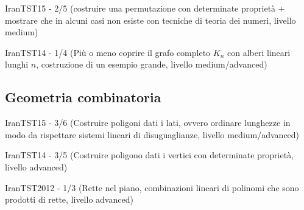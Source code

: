 \documentclass[a4paper,10pt]{article}
\newcommand{\Pro}[3]{#1#2 - #3}
\begin{document}
\Pro{IranTST}{15}{2/5} (costruire una permutazione con determinate proprietà + mostrare che in alcuni casi non esiste con tecniche
di teoria dei numeri, livello medium)

\Pro{IranTST}{14}{1/4} (Più o meno coprire il grafo completo $K_n$ con alberi lineari lunghi $n$, costruzione di un esempio grande,
livello medium/advanced)

\subsection{Geometria combinatoria}
\Pro{IranTST}{15}{3/6} (Costruire poligoni dati i lati, ovvero ordinare lunghezze in modo da rispettare sistemi lineari di
disuguaglianze, livello medium/advanced)

\Pro{IranTST}{14}{3/5} (Costruire poligono dati i vertici con determinate proprietà, livello advanced)

\Pro{IranTST}{2012}{1/3} (Rette nel piano, combinazioni lineari di polinomi che sono prodotti di rette, livello advanced)
\end{document}
